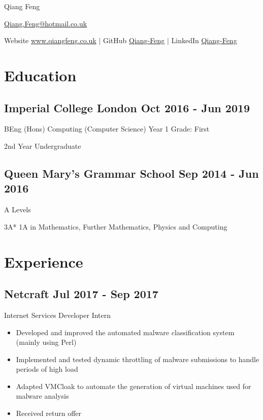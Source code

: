 \documentclass[a4paper]{article}
\begin{document}
\begin{center}
    {\huge Qiang Feng}

    \vspace{2pt}

    \href{mailto:Qiang.Feng@hotmail.co.uk}{Qiang.Feng@hotmail.co.uk}

    \vspace{2pt}

    Website \href{https://www.qiangfeng.co.uk}{www.qiangfeng.co.uk} $\mid$
    GitHub \href{https://github.com/Qiang-Feng}{Qiang-Feng} $\mid$
    LinkedIn \href{https://www.linkedin.com/in/qiang-feng/}{Qiang-Feng}
\end{center}

\section*{Education}

\subsection*{Imperial College London \hfill Oct 2016 - Jun 2019}

BEng (Hons) Computing (Computer Science) \hfill Year 1 Grade: First

2nd Year Undergraduate

\subsection*{Queen Mary's Grammar School \hfill Sep 2014 - Jun 2016}

A Levels

3A* 1A in Mathematics, Further Mathematics, Physics and Computing

\section*{Experience}

\subsection*{Netcraft \hfill Jul 2017 - Sep 2017}

Internet Services Developer Intern

\begin{itemize}
    \item Developed and improved the automated malware classification system (mainly using Perl)
    \item Implemented and tested dynamic throttling of malware submissions to handle periods of high load
    \item Adapted VMCloak to automate the generation of virtual machines used for malware analysis
    \item Received return offer
\end{itemize}
\end{document}
